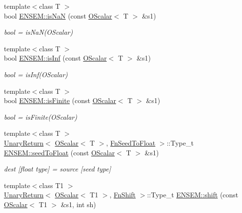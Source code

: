\begin{DoxyCompactItemize}
{\footnotesize template$<$class T $>$ }\\bool \mbox{\hyperlink{group__obsscalar_ga265314c3773d12257146fec9dd1c2524}{E\+N\+S\+E\+M\+::is\+NaN}} (const \mbox{\hyperlink{classENSEM_1_1OScalar}{O\+Scalar}}$<$ T $>$ \&s1)
\begin{DoxyCompactList}\small\item\em bool = is\+Na\+N(\+O\+Scalar) \end{DoxyCompactList}\item 
{\footnotesize template$<$class T $>$ }\\bool \mbox{\hyperlink{group__obsscalar_ga53c459a4a8b7d6d7df49c71d8c998c48}{E\+N\+S\+E\+M\+::is\+Inf}} (const \mbox{\hyperlink{classENSEM_1_1OScalar}{O\+Scalar}}$<$ T $>$ \&s1)
\begin{DoxyCompactList}\small\item\em bool = is\+Inf(\+O\+Scalar) \end{DoxyCompactList}\item 
{\footnotesize template$<$class T $>$ }\\bool \mbox{\hyperlink{group__obsscalar_gaff9bdb2f6b1615afede07ee45e2ed616}{E\+N\+S\+E\+M\+::is\+Finite}} (const \mbox{\hyperlink{classENSEM_1_1OScalar}{O\+Scalar}}$<$ T $>$ \&s1)
\begin{DoxyCompactList}\small\item\em bool = is\+Finite(\+O\+Scalar) \end{DoxyCompactList}\item 
{\footnotesize template$<$class T $>$ }\\\mbox{\hyperlink{structENSEM_1_1UnaryReturn}{Unary\+Return}}$<$ \mbox{\hyperlink{classENSEM_1_1OScalar}{O\+Scalar}}$<$ T $>$, \mbox{\hyperlink{structENSEM_1_1FnSeedToFloat}{Fn\+Seed\+To\+Float}} $>$\+::Type\+\_\+t \mbox{\hyperlink{group__obsscalar_gad5154b123a75f53178134d8518242639}{E\+N\+S\+E\+M\+::seed\+To\+Float}} (const \mbox{\hyperlink{classENSEM_1_1OScalar}{O\+Scalar}}$<$ T $>$ \&s1)
\begin{DoxyCompactList}\small\item\em dest \mbox{[}float type\mbox{]} = source \mbox{[}seed type\mbox{]} \end{DoxyCompactList}\item 
{\footnotesize template$<$class T1 $>$ }\\\mbox{\hyperlink{structENSEM_1_1UnaryReturn}{Unary\+Return}}$<$ \mbox{\hyperlink{classENSEM_1_1OScalar}{O\+Scalar}}$<$ T1 $>$, \mbox{\hyperlink{structENSEM_1_1FnShift}{Fn\+Shift}} $>$\+::Type\+\_\+t \mbox{\hyperlink{group__obsscalar_ga2baf234651cfec54ad620a11e79d6ac6}{E\+N\+S\+E\+M\+::shift}} (const \mbox{\hyperlink{classENSEM_1_1OScalar}{O\+Scalar}}$<$ T1 $>$ \&s1, int sh)

\end{DoxyCompactItemize}
